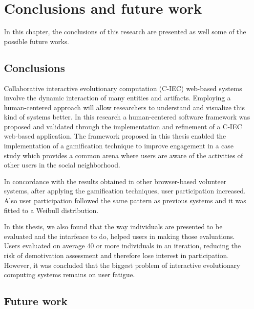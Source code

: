 \chapter{Conclusions and future work} \label{sec:5}

In this chapter, the conclusions of this research are presented as well some of
the possible future works.

\section{Conclusions}

Collaborative interactive evolutionary computation (C-IEC)
web-based systems involve the dynamic interaction of many entities and
artifacts. Employing a human-centered approach will allow researchers to
understand and visualize this kind of systems better. In this research a
human-centered software framework was proposed and validated through the
implementation and refinement of a C-IEC web-based application. 
The framework proposed in this thesis enabled the implementation of 
a gamification technique to improve engagement in
a case study which provides a common arena where users are aware of the
activities of other users in the social neighborhood.

In concordance with the results obtained in other browser-based volunteer
systems, after applying the gamification techniques, user participation
increased. Also user participation followed the same pattern as previous systems
and it was fitted to a Weibull distribution.

In this thesis, we also found that the way individuals are presented to be
evaluated and the intarfeace to do, helped users in making those evaluations.
Users evaluated on average 40 or more individuals in an iteration, 
reducing the risk of demotivation assessment and
therefore lose interest in participation. However, it was concluded that the
biggest problem of interactive evolutionary computing systems remains on user
fatigue.


\section{Future work}

